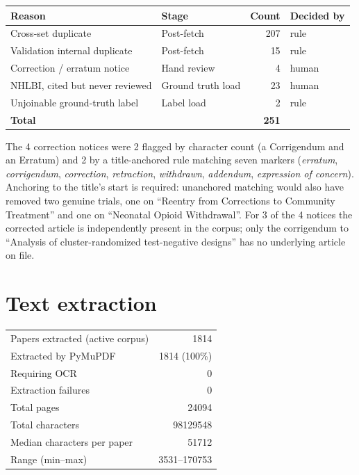 \documentclass[11pt]{article}
\begin{document}
\begin{table}[h]
\centering
\begin{tabular}{llrl}
\toprule
\textbf{Reason} & \textbf{Stage} & \textbf{Count} & \textbf{Decided by} \\
\midrule
Cross-set duplicate & Post-fetch & 207 & rule \\
Validation internal duplicate & Post-fetch & 15 & rule \\
Correction / erratum notice & Hand review & 4 & human \\
NHLBI, cited but never reviewed & Ground truth load & 23 & human \\
Unjoinable ground-truth label & Label load & 2 & rule \\
\midrule
\textbf{Total} & & \textbf{251} & \\
\bottomrule
\end{tabular}
\end{table}

The 4 correction notices were 2 flagged by character count (a Corrigendum and an Erratum) and 2 by a
title-anchored rule matching seven markers (\emph{erratum}, \emph{corrigendum}, \emph{correction},
\emph{retraction}, \emph{withdrawn}, \emph{addendum}, \emph{expression of concern}). Anchoring to the
title's start is required: unanchored matching would also have removed two genuine trials, one on
``Reentry from Corrections to Community Treatment'' and one on ``Neonatal Opioid Withdrawal''. For 3 of
the 4 notices the corrected article is independently present in the corpus; only the corrigendum to
``Analysis of cluster-randomized test-negative designs'' has no underlying article on file.

\section{Text extraction}

\begin{table}[h]
\centering
\begin{tabular}{lr}
\toprule
Papers extracted (active corpus) & 1814 \\
Extracted by PyMuPDF & 1814 (100\%) \\
Requiring OCR & 0 \\
Extraction failures & 0 \\
Total pages & \num{24094} \\
Total characters & \num{98129548} \\
Median characters per paper & \num{51712} \\
Range (min--max) & \num{3531}--\num{170753} \\
\bottomrule
\end{tabular}
\end{table}
\end{document}

